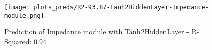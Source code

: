 
\begin{figure}[H]
    \centering
    \texttt{[image: plots\_preds/R2-93.87-Tanh2HiddenLayer-Impedance-module.png]}
    \caption{Prediction of Impedance module with Tanh2HiddenLayer - R-Squared: 0.94}
\end{figure}
